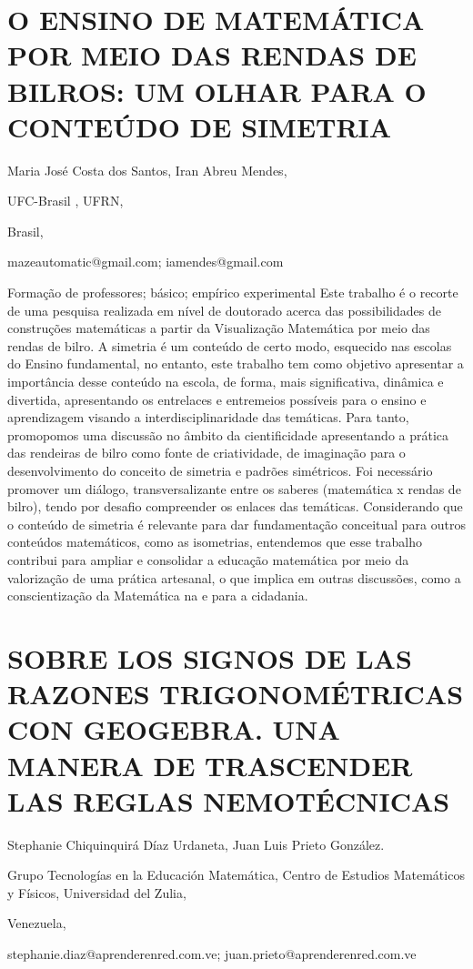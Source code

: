 \section{O ENSINO DE MATEMÁTICA POR MEIO DAS RENDAS DE BILROS: UM OLHAR PARA
O CONTEÚDO DE SIMETRIA}

\begin{datos}

Maria José Costa dos Santos, Iran Abreu Mendes,

UFC-Brasil , UFRN,

Brasil,

mazeautomatic@gmail.com; iamendes@gmail.com 

\end{datos}

Formação de professores; básico; empírico experimental Este trabalho
é o recorte de uma pesquisa realizada em nível de doutorado acerca
das possibilidades de construções matemáticas a partir da Visualização
Matemática por meio das rendas de bilro. A simetria é um conteúdo
de certo modo, esquecido nas escolas do Ensino fundamental, no entanto,
este trabalho tem como objetivo apresentar a importância desse conteúdo
na escola, de forma, mais significativa, dinâmica e divertida, apresentando
os entrelaces e entremeios possíveis para o ensino e aprendizagem
visando a interdisciplinaridade das temáticas. Para tanto, promopomos
uma discussão no âmbito da cientificidade apresentando a prática das
rendeiras de bilro como fonte de criatividade, de imaginação para
o desenvolvimento do conceito de simetria e padrões simétricos. Foi
necessário promover um diálogo, transversalizante entre os saberes
(matemática x rendas de bilro), tendo por desafio compreender os enlaces
das temáticas. Considerando que o conteúdo de simetria é relevante
para dar fundamentação conceitual para outros conteúdos matemáticos,
como as isometrias, entendemos que esse trabalho contribui para ampliar
e consolidar a educação matemática por meio da valorização de uma
prática artesanal, o que implica em outras discussões, como a conscientização
da Matemática na e para a cidadania.


\section{SOBRE LOS SIGNOS DE LAS RAZONES TRIGONOMÉTRICAS CON GEOGEBRA. UNA
MANERA DE TRASCENDER LAS REGLAS NEMOTÉCNICAS}

\begin{datos}

Stephanie Chiquinquirá Díaz Urdaneta, Juan Luis Prieto González.

Grupo Tecnologías en la Educación Matemática, Centro de Estudios Matemáticos
y Físicos, Universidad del Zulia, 

Venezuela,

stephanie.diaz@aprenderenred.com.ve; juan.prieto@aprenderenred.com.ve

\end{datos}

